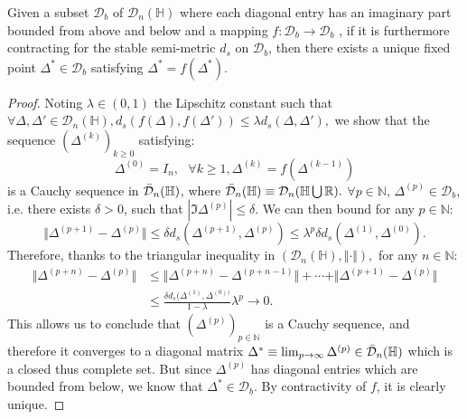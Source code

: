 \documentclass[ECP, preprint]{ejpecp} %
\begin{document}
\begin{theorem}
Given a subset $\mathcal{D}_b$ of $\mathcal{D}_n(\mathbb{H})$ where each diagonal entry has an imaginary part bounded from above and below and a mapping $f:\mathcal{D}_b \to \mathcal{D}_b$ , if it is furthermore contracting for the stable semi-metric $d_s$ on $\mathcal{D}_b$, then there exists a unique fixed point $\Delta^*\in \mathcal{D}_b$ satisfying $\Delta^*=f(\Delta^*)$. 
\end{theorem}
\begin{proof}
Noting $\lambda \in(0,1)$ the Lipschitz constant such that $\forall \Delta,\Delta'\in \mathcal{D}_n(\mathbb{H}), d_s(f(\Delta),f(\Delta'))\leq \lambda d_s(\Delta,\Delta'),$ we show that the sequence $(\Delta^{(k)})_{k\geq 0}$ satisfying:
$$\Delta^{(0)}=I_n, \ \ \ \forall k\geq 1, \Delta^{(k)}=f(\Delta^{(k-1)})$$
is a Cauchy sequence in $\Bar{\mathcal{D}}_n(\mathbb{H})$, where $\Bar{\mathcal{D}}_n(\mathbb{H})\equiv \mathcal{D}_n(\mathbb{H}\bigcup \mathbb{R}).$
$\forall p\in\mathbb{N}$, $\Delta^{(p)}\in \mathcal{D}_b$, i.e. there exists $\delta>0$, such that $|\Im \Delta^{(p)}|\leq \delta.$
We can then bound for any $p\in\mathbb{N}:$
$$\Vert \Delta^{(p+1)}-\Delta^{(p)}\Vert \leq \delta d_s(\Delta^{(p+1)},\Delta^{(p)})\leq \lambda^p \delta d_s(\Delta^{(1)},\Delta^{(0)}).$$
Therefore, thanks to the triangular inequality in $(\mathcal{D}_n(\mathbb{H}),\Vert\cdot\Vert),$ for any $n\in\mathbb{N}:$
\begin{equation*}
\begin{split}
\Vert \Delta^{(p+n)}-\Delta^{(p)}\Vert &\leq \Vert \Delta^{(p+n)}-\Delta^{(p+n-1)}\Vert+\cdots +\Vert\Delta^{(p+1)}-\Delta^{(p)}\Vert \\
&\leq \frac{\delta d_s(\Delta^{(1)},\Delta^{(0))}}{1-\lambda}\lambda^p\to 0.    
\end{split}
\end{equation*}
This allows us to conclude that $(\Delta^{(p)})_{p\in \mathbb{N}}$ is a Cauchy sequence, and therefore it converges to a diagonal matrix $\Delta^{*}\equiv \lim_{p\to\infty} \Delta^{(p)}\in \Bar{\mathcal{D}}_n(\mathbb{H})$ which is a closed thus complete set. But since $\Delta^{(p)}$ has diagonal entries which are bounded from below, we know that $\Delta^*\in \mathcal{D}_b$.
By contractivity of $f$, it is clearly unique.
\end{proof}
\end{document}
